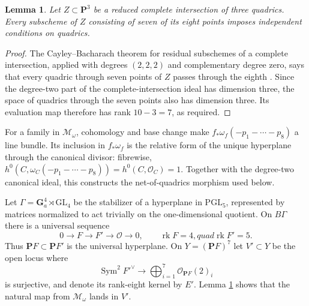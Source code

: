 \documentclass[12pt,reqno]{amsart}
\newcommand{\M}{\mathcal{M}}
\newtheorem{lemma}[theorem]{Lemma}
\theoremstyle{definition}
\theoremstyle{remark}
\begin{document}
\begin{lemma}\label{lem:seven-points}
Let $Z\subset\mathbf P^3$ be a reduced complete intersection of three
quadrics.  Every subscheme of $Z$ consisting of seven of its eight points
imposes independent conditions on quadrics.
\end{lemma}

\begin{proof}
The Cayley--Bacharach theorem for residual subschemes of a complete
intersection, applied with degrees $(2,2,2)$ and complementary degree zero,
says that every quadric through seven points of $Z$ passes through the eighth
\cite[Theorem~CB7]{EGH}.  Since the degree-two part of the complete-intersection
ideal has dimension three, the space of quadrics through the seven points also
has dimension three.  Its evaluation map therefore has rank
$10-3=7$, as required.
\end{proof}

For a family in $\M_\omega$, cohomology and base change make
$f_*\omega_f(-p_1-\cdots-p_8)$ a line bundle.  Its inclusion in
$f_*\omega_f$ is the relative form of the unique hyperplane through the
canonical divisor: fibrewise,
$h^0(C,\omega_C(-p_1-\cdots-p_8))=h^0(C,\mathcal O_C)=1$.
Together with the degree-two canonical ideal, this constructs the
net-of-quadrics morphism used below.

Let $\Gamma=\mathbf G_a^4\rtimes\mathrm{GL}_4$ be the stabilizer of a
hyperplane in $\mathrm{PGL}_5$, represented by matrices normalized to act
trivially on the one-dimensional quotient.  On $B\Gamma$ there is a universal
sequence
\begin{equation}\label{eq:Gamma-sequence}
 0\longrightarrow F\longrightarrow F'\longrightarrow\mathcal O
 \longrightarrow0,
 \qquad \operatorname{rk}F=4,quad\operatorname{rk}F'=5.
\end{equation}
Thus $\mathbf P F\subset\mathbf P F'$ is the universal hyperplane.  On
$Y=(\mathbf P F)^7$ let $V'\subset Y$ be the open locus where
\begin{equation}\label{eq:exceptional-evaluation}
 \operatorname{Sym}^2F'^\vee\longrightarrow
 \bigoplus_{i=1}^7\mathcal O_{\mathbf P F}(2)_i
\end{equation}
is surjective, and denote its rank-eight kernel by $E'$.  Lemma
\ref{lem:seven-points} shows that the natural map from $\M_\omega$ lands in
$V'$.
\end{document}
